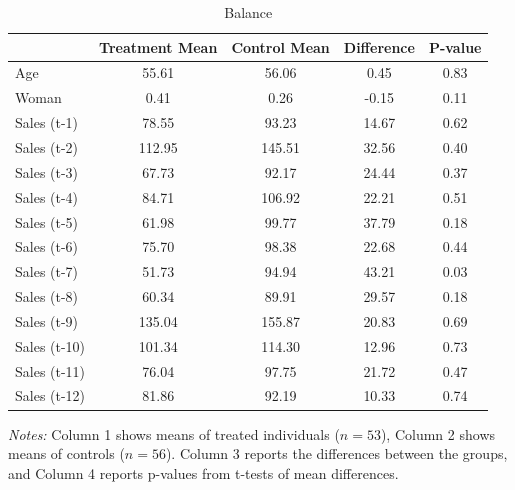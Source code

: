 \documentclass[12pt]{article}
\begin{document}
\begin{table}[H]
\centering
\begin{threeparttable}
\caption{\label{tab:balance} Balance}
\begin{tabular}{lcccc}
\toprule
 & Treatment Mean & Control Mean & Difference & P-value \\
\midrule
Age & 55.61 & 56.06 & 0.45 & 0.83 \\
Woman & 0.41 & 0.26 & -0.15 & 0.11 \\
Sales (t-1) & 78.55 & 93.23 & 14.67 & 0.62 \\
Sales (t-2) & 112.95 & 145.51 & 32.56 & 0.40 \\
Sales (t-3) & 67.73 & 92.17 & 24.44 & 0.37 \\
Sales (t-4) & 84.71 & 106.92 & 22.21 & 0.51 \\
Sales (t-5) & 61.98 & 99.77 & 37.79 & 0.18 \\
Sales (t-6) & 75.70 & 98.38 & 22.68 & 0.44 \\
Sales (t-7) & 51.73 & 94.94 & 43.21 & 0.03 \\
Sales (t-8) & 60.34 & 89.91 & 29.57 & 0.18 \\
Sales (t-9) & 135.04 & 155.87 & 20.83 & 0.69 \\
Sales (t-10) & 101.34 & 114.30 & 12.96 & 0.73 \\
Sales (t-11) & 76.04 & 97.75 & 21.72 & 0.47 \\
Sales (t-12) & 81.86 & 92.19 & 10.33 & 0.74 \\
\bottomrule
\end{tabular}
\begin{tablenotes}[flushleft]   %
\small
\item \textit{Notes:} Column 1 shows means of treated individuals ($n = 53$), Column 2 shows means of controls ($n = 56$). Column 3 reports the differences between the groups, and Column 4 reports p-values from t-tests of mean differences.
\end{tablenotes}
\end{threeparttable}
\end{table}
\clearpage
\end{document}
